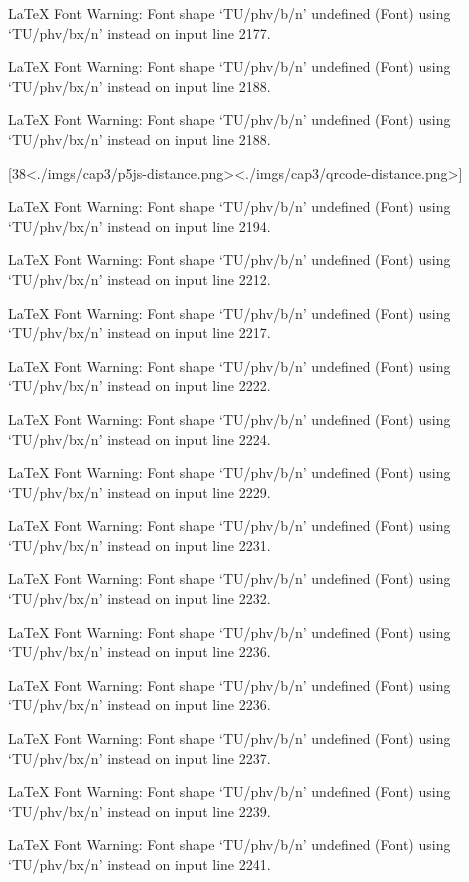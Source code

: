 LaTeX Font Warning: Font shape `TU/phv/b/n' undefined
(Font)              using `TU/phv/bx/n' instead on input line 2177.


LaTeX Font Warning: Font shape `TU/phv/b/n' undefined
(Font)              using `TU/phv/bx/n' instead on input line 2188.


LaTeX Font Warning: Font shape `TU/phv/b/n' undefined
(Font)              using `TU/phv/bx/n' instead on input line 2188.

[38<./imgs/cap3/p5js-distance.png><./imgs/cap3/qrcode-distance.png>]

LaTeX Font Warning: Font shape `TU/phv/b/n' undefined
(Font)              using `TU/phv/bx/n' instead on input line 2194.


LaTeX Font Warning: Font shape `TU/phv/b/n' undefined
(Font)              using `TU/phv/bx/n' instead on input line 2212.


LaTeX Font Warning: Font shape `TU/phv/b/n' undefined
(Font)              using `TU/phv/bx/n' instead on input line 2217.


LaTeX Font Warning: Font shape `TU/phv/b/n' undefined
(Font)              using `TU/phv/bx/n' instead on input line 2222.


LaTeX Font Warning: Font shape `TU/phv/b/n' undefined
(Font)              using `TU/phv/bx/n' instead on input line 2224.


LaTeX Font Warning: Font shape `TU/phv/b/n' undefined
(Font)              using `TU/phv/bx/n' instead on input line 2229.


LaTeX Font Warning: Font shape `TU/phv/b/n' undefined
(Font)              using `TU/phv/bx/n' instead on input line 2231.


LaTeX Font Warning: Font shape `TU/phv/b/n' undefined
(Font)              using `TU/phv/bx/n' instead on input line 2232.


LaTeX Font Warning: Font shape `TU/phv/b/n' undefined
(Font)              using `TU/phv/bx/n' instead on input line 2236.


LaTeX Font Warning: Font shape `TU/phv/b/n' undefined
(Font)              using `TU/phv/bx/n' instead on input line 2236.


LaTeX Font Warning: Font shape `TU/phv/b/n' undefined
(Font)              using `TU/phv/bx/n' instead on input line 2237.


LaTeX Font Warning: Font shape `TU/phv/b/n' undefined
(Font)              using `TU/phv/bx/n' instead on input line 2239.


LaTeX Font Warning: Font shape `TU/phv/b/n' undefined
(Font)              using `TU/phv/bx/n' instead on input line 2241.

